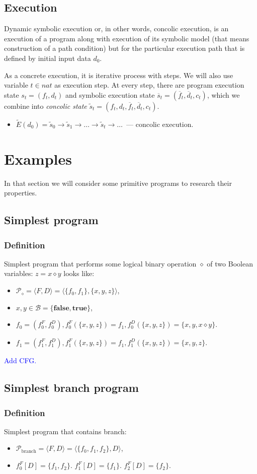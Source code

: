 \documentclass[fleqn,oneside,a4]{article}
\newcommand{\level}{\section}
\newcommand{\sublevel}{\subsection}
\newcommand{\subsublevel}{\subsubsection}
\newcommand{\comment}[1]{\textcolor{blue}{#1}}  %
\newcommand{\ra}{\rightarrow}
\newcommand{\term}[1]{\textit{#1}\index{#1}}
\newcommand{\true}{\textbf{true}}
\newcommand{\false}{\textbf{false}}
\newcommand{\se}{\overline}    %
\newcommand{\dse}{\widetilde}  %
\begin{document}
\sublevel{Execution}

Dynamic symbolic execution or, in other words, concolic execution, is
an execution of a program along with execution of its symbolic model
(that means construction of a path condition) but for the particular
execution path that is defined by initial input data $d_0$.

As a concrete execution, it is iterative process with steps.
We will also use variable $t \in nat$ as execution step.
At every step, there are program execution state $s_t = (f_t, d_t)$
and symbolic execution state $\se{s}_t = (\se{f}_t, \se{d}_t, c_t)$,
which we combine into \term{concolic state}
$\dse{s}_t = (f_t, d_t, \se{f}_t, \se{d}_t, c_t)$.

\begin{itemize}
    \item $\dse{E}(d_0) = \dse{s}_0 \ra \dse{s}_1 \ra \dots
        \ra \dse{s}_t \ra \dots$~--- concolic execution.
\end{itemize}

\level{Examples}

In that section we will consider some primitive programs
to research their properties.

\sublevel{Simplest program}

\subsublevel{Definition}

Simplest program that performs some logical binary operation $\diamond$
of two Boolean variables: $z = x \diamond y$ looks like:
\begin{itemize}
    \item $\mathcal{P}_{\diamond} = \langle F, D \rangle =
        \langle \{f_0, f_1\}, \{x, y, z\} \rangle$,
    \item $x, y \in \mathcal{B} = \{\false, \true\}$,
    \item $f_0 = (f^F_0, f^D_0), f^F_0(\{x, y, z\}) = f_1,
        f^D_0(\{x, y, z\}) = \{x, y, x \diamond y\}$.
    \item $f_1 = (f^F_1, f^D_1), f^F_1(\{x, y, z\}) = f_1,
        f^D_1(\{x, y, z\}) = \{x, y, z\}$.
\end{itemize}

\comment{Add CFG.}

\sublevel{Simplest branch program}

\subsublevel{Definition}

Simplest program that contains branch:
\begin{itemize}
    \item $\mathcal{P}_{\text{branch}} = \langle F, D \rangle =
        \langle \{f_0, f_1, f_2\}, D \rangle$,
    \item $f_0^F[D] = \{f_1, f_2\}$.
        $f_1^F[D] = \{f_1\}$. $f_2^F[D] = \{f_2\}$.
\end{itemize}
\end{document}
